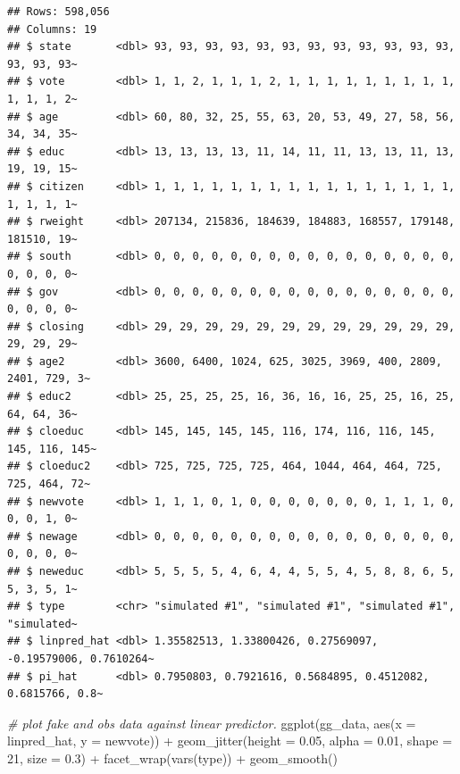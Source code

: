 \documentclass[
]{book}
\newenvironment{Shaded}{\begin{snugshade}}{\end{snugshade}}
\newcommand{\AttributeTok}[1]{\textcolor[rgb]{0.77,0.63,0.00}{#1}}
\newcommand{\CommentTok}[1]{\textcolor[rgb]{0.56,0.35,0.01}{\textit{#1}}}
\newcommand{\DecValTok}[1]{\textcolor[rgb]{0.00,0.00,0.81}{#1}}
\newcommand{\FloatTok}[1]{\textcolor[rgb]{0.00,0.00,0.81}{#1}}
\newcommand{\FunctionTok}[1]{\textcolor[rgb]{0.00,0.00,0.00}{#1}}
\newcommand{\NormalTok}[1]{#1}
\newcommand{\SpecialCharTok}[1]{\textcolor[rgb]{0.00,0.00,0.00}{#1}}
\begin{document}
\begin{verbatim}
## Rows: 598,056
## Columns: 19
## $ state       <dbl> 93, 93, 93, 93, 93, 93, 93, 93, 93, 93, 93, 93, 93, 93, 93~
## $ vote        <dbl> 1, 1, 2, 1, 1, 1, 2, 1, 1, 1, 1, 1, 1, 1, 1, 1, 1, 1, 1, 2~
## $ age         <dbl> 60, 80, 32, 25, 55, 63, 20, 53, 49, 27, 58, 56, 34, 34, 35~
## $ educ        <dbl> 13, 13, 13, 13, 11, 14, 11, 11, 13, 13, 11, 13, 19, 19, 15~
## $ citizen     <dbl> 1, 1, 1, 1, 1, 1, 1, 1, 1, 1, 1, 1, 1, 1, 1, 1, 1, 1, 1, 1~
## $ rweight     <dbl> 207134, 215836, 184639, 184883, 168557, 179148, 181510, 19~
## $ south       <dbl> 0, 0, 0, 0, 0, 0, 0, 0, 0, 0, 0, 0, 0, 0, 0, 0, 0, 0, 0, 0~
## $ gov         <dbl> 0, 0, 0, 0, 0, 0, 0, 0, 0, 0, 0, 0, 0, 0, 0, 0, 0, 0, 0, 0~
## $ closing     <dbl> 29, 29, 29, 29, 29, 29, 29, 29, 29, 29, 29, 29, 29, 29, 29~
## $ age2        <dbl> 3600, 6400, 1024, 625, 3025, 3969, 400, 2809, 2401, 729, 3~
## $ educ2       <dbl> 25, 25, 25, 25, 16, 36, 16, 16, 25, 25, 16, 25, 64, 64, 36~
## $ cloeduc     <dbl> 145, 145, 145, 145, 116, 174, 116, 116, 145, 145, 116, 145~
## $ cloeduc2    <dbl> 725, 725, 725, 725, 464, 1044, 464, 464, 725, 725, 464, 72~
## $ newvote     <dbl> 1, 1, 1, 0, 1, 0, 0, 0, 0, 0, 0, 0, 1, 1, 1, 0, 0, 0, 1, 0~
## $ newage      <dbl> 0, 0, 0, 0, 0, 0, 0, 0, 0, 0, 0, 0, 0, 0, 0, 0, 0, 0, 0, 0~
## $ neweduc     <dbl> 5, 5, 5, 5, 4, 6, 4, 4, 5, 5, 4, 5, 8, 8, 6, 5, 5, 3, 5, 1~
## $ type        <chr> "simulated #1", "simulated #1", "simulated #1", "simulated~
## $ linpred_hat <dbl> 1.35582513, 1.33800426, 0.27569097, -0.19579006, 0.7610264~
## $ pi_hat      <dbl> 0.7950803, 0.7921616, 0.5684895, 0.4512082, 0.6815766, 0.8~
\end{verbatim}

\begin{Shaded}
\begin{Highlighting}[]
\CommentTok{\# plot fake and obs data against linear predictor.}
\FunctionTok{ggplot}\NormalTok{(gg\_data, }\FunctionTok{aes}\NormalTok{(}\AttributeTok{x =}\NormalTok{ linpred\_hat, }\AttributeTok{y =}\NormalTok{ newvote)) }\SpecialCharTok{+} 
  \FunctionTok{geom\_jitter}\NormalTok{(}\AttributeTok{height =} \FloatTok{0.05}\NormalTok{, }\AttributeTok{alpha =} \FloatTok{0.01}\NormalTok{, }\AttributeTok{shape =} \DecValTok{21}\NormalTok{, }\AttributeTok{size =} \FloatTok{0.3}\NormalTok{) }\SpecialCharTok{+} 
  \FunctionTok{facet\_wrap}\NormalTok{(}\FunctionTok{vars}\NormalTok{(type)) }\SpecialCharTok{+} 
  \FunctionTok{geom\_smooth}\NormalTok{()}
\end{Highlighting}
\end{Shaded}
\end{document}

